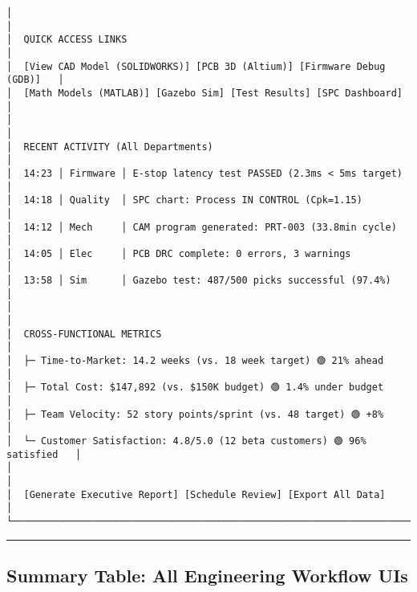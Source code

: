 \documentclass[
]{article}
\begin{document}
\begin{verbatim}
│                                                                            │
│  QUICK ACCESS LINKS                                                        │
│  [View CAD Model (SOLIDWORKS)] [PCB 3D (Altium)] [Firmware Debug (GDB)]   │
│  [Math Models (MATLAB)] [Gazebo Sim] [Test Results] [SPC Dashboard]       │
│                                                                            │
│  RECENT ACTIVITY (All Departments)                                         │
│  14:23 │ Firmware │ E-stop latency test PASSED (2.3ms < 5ms target)       │
│  14:18 │ Quality  │ SPC chart: Process IN CONTROL (Cpk=1.15)              │
│  14:12 │ Mech     │ CAM program generated: PRT-003 (33.8min cycle)        │
│  14:05 │ Elec     │ PCB DRC complete: 0 errors, 3 warnings                │
│  13:58 │ Sim      │ Gazebo test: 487/500 picks successful (97.4%)         │
│                                                                            │
│  CROSS-FUNCTIONAL METRICS                                                  │
│  ├─ Time-to-Market: 14.2 weeks (vs. 18 week target) 🟢 21% ahead          │
│  ├─ Total Cost: $147,892 (vs. $150K budget) 🟢 1.4% under budget          │
│  ├─ Team Velocity: 52 story points/sprint (vs. 48 target) 🟢 +8%          │
│  └─ Customer Satisfaction: 4.8/5.0 (12 beta customers) 🟢 96% satisfied   │
│                                                                            │
│  [Generate Executive Report] [Schedule Review] [Export All Data]          │
└────────────────────────────────────────────────────────────────────────────┘
\end{verbatim}

\begin{center}\rule{0.5\linewidth}{0.5pt}\end{center}

\hypertarget{summary-table-all-engineering-workflow-uis}{%
\subsection{Summary Table: All Engineering Workflow
UIs}\label{summary-table-all-engineering-workflow-uis}}
\end{document}
